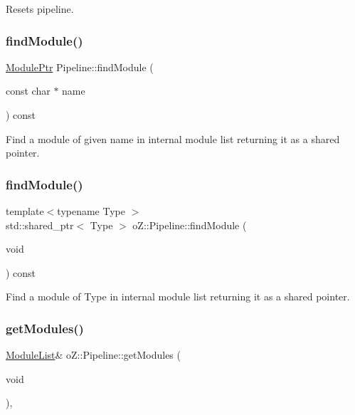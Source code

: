 Resets pipeline. 

\mbox{\label{classo_z_1_1_pipeline_aa8aa56af891b2d889e7c21198daa1451}} 
\subsubsection{\texorpdfstring{findModule()}{findModule()}\hspace{0.1cm}{\footnotesize\ttfamily [1/2]}}
{\footnotesize\ttfamily \mbox{\hyperlink{namespaceo_z_af5a56aaaee027504979038f38991adcf}{Module\+Ptr}} Pipeline\+::find\+Module (\begin{DoxyParamCaption}\item[{const char $\ast$}]{name }\end{DoxyParamCaption}) const}



Find a module of given name in internal module list returning it as a shared pointer. 

\mbox{\label{classo_z_1_1_pipeline_a4f1abc0f7c0985dbc859cd5b20082998}} 
\subsubsection{\texorpdfstring{findModule()}{findModule()}\hspace{0.1cm}{\footnotesize\ttfamily [2/2]}}
{\footnotesize\ttfamily template$<$typename Type $>$ \\
std\+::shared\+\_\+ptr$<$ Type $>$ o\+Z\+::\+Pipeline\+::find\+Module (\begin{DoxyParamCaption}\item[{void}]{ }\end{DoxyParamCaption}) const}



Find a module of Type in internal module list returning it as a shared pointer. 

\mbox{\label{classo_z_1_1_pipeline_a3886c29b903d2e359a853ea76711661b}} 
\subsubsection{\texorpdfstring{getModules()}{getModules()}\hspace{0.1cm}{\footnotesize\ttfamily [1/2]}}
{\footnotesize\ttfamily \mbox{\hyperlink{classo_z_1_1_pipeline_a3bb478d291a83763b269d8d27e186a47}{Module\+List}}\& o\+Z\+::\+Pipeline\+::get\+Modules (\begin{DoxyParamCaption}\item[{void}]{ }\end{DoxyParamCaption})\hspace{0.3cm}{\ttfamily [inline]}, {\ttfamily [noexcept]}}



